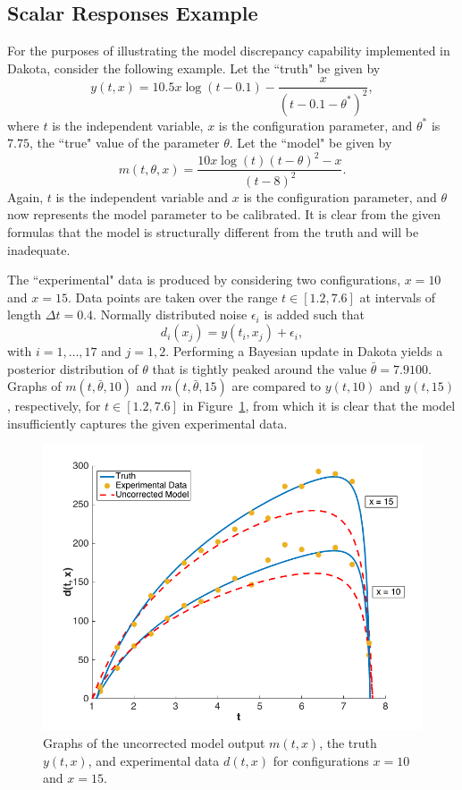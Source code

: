 \subsection{Scalar Responses Example}

For the purposes of illustrating the model discrepancy capability implemented
in Dakota, consider the following example. Let the ``truth" be given by
\begin{equation}\label{eq:md_truth}
y(t,x) = 10.5 x \log(t-0.1) - \frac{x}{(t-0.1-\theta^{*})^2},
\end{equation}
where $t$ is the independent variable, $x$ is the configuration parameter, and
$\theta^{*}$ is $7.75$, the ``true" value of the parameter $\theta$. Let the
``model" be given by
\begin{equation}\label{eq:md_model}
m(t,\theta, x) = \frac{10 x \log(t) (t-\theta)^2 - x}{(t-8)^2}. 
\end{equation}
Again, $t$ is the independent variable and $x$ is the configuration parameter,
and $\theta$ now represents the model parameter to be calibrated. It is clear
from the given formulas that the model is structurally different from the truth
and will be inadequate. 

The ``experimental" data is produced by considering two configurations, $x=10$
and $x=15$. Data points are taken over the range $t \in [1.2, 7.6]$ at 
intervals of length $\Delta t = 0.4$. Normally distributed noise $\epsilon_i$ 
is added such that
\begin{equation}\label{eq:md_data}
d_i(x_j) = y(t_i, x_j) + \epsilon_i,
\end{equation} 
with $i = 1, \ldots, 17$ and $j = 1,2$. Performing a 
Bayesian update in Dakota yields a posterior distribution of $\theta$ that is 
tightly peaked around the value $\bar{\theta} = 7.9100$. Graphs of 
$m(t, \bar{\theta}, 10)$ and $m(t, \bar{\theta}, 15)$ are compared to 
$y(t, 10)$ and $y(t, 15)$, respectively, for $t \in [1.2, 7.6]$ in 
Figure~\ref{fig:md_uncorr}, from which it is clear that the model insufficiently
captures the given experimental data.

\begin{figure}[t]
\begin{center}
\includegraphics[width=.6\textwidth]{images/moddiscrep_TruthExpModel.png}
\end{center}
\vspace{-0.5cm}
\caption{Graphs of the uncorrected model output $m(t,x)$, the truth $y(t,x)$,
and experimental data $d(t,x)$ for configurations $x = 10$ and $x = 15$.}
\label{fig:md_uncorr}
\end{figure}

